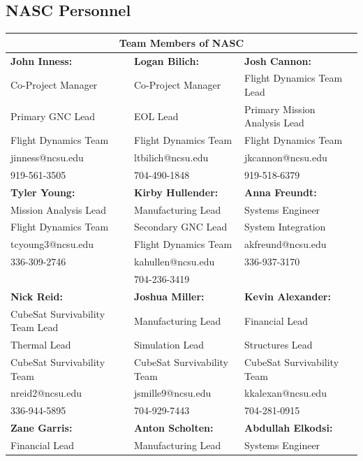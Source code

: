 \subsection{NASC Personnel}
%
\begin{center}
\begin{tabular}{|p{5.3cm}||p{5.3cm}||p{5.3cm}|}
\hline
 \multicolumn{3}{|c|}{Team Members of NASC} \\
 \hline %
 \textbf{John Inness:}&  \textbf{Logan Bilich: }& \textbf{Josh Cannon: }\\ 
 Co-Project Manager   & Co-Project Manager & Flight Dynamics Team Lead   \\
 Primary GNC Lead & EOL Lead & Primary Mission Analysis Lead \\
 Flight Dynamics Team  & Flight Dynamics Team  & Flight Dynamics Team  \\
 jinness@ncsu.edu   & ltbilich@ncsu.edu   & jkcannon@ncsu.edu \\
 919-561-3505  & 704-490-1848 & 919-518-6379 \\
\hline %
 \textbf{Tyler Young: } &  \textbf{Kirby Hullender:} & \textbf{Anna Freundt:}\\ 
  Mission Analysis Lead  & Manufacturing Lead & Systems Engineer   \\
Flight Dynamics Team  & Secondary GNC Lead & System Integration \\
 tcyoung3@ncsu.edu  & Flight Dynamics Team &  akfreund@ncsu.edu \\
 336-309-2746   & kahullen@ncsu.edu & 336-937-3170 \\
 & 704-236-3419  & \\
 \hline %
 \textbf{Nick Reid: }&  \textbf{Joshua Miller: }& \textbf{Kevin Alexander: }\\ 
 CubeSat Survivability Team Lead   & Manufacturing Lead & Financial Lead   \\
 Thermal Lead & Simulation Lead & Structures Lead \\
 CubeSat Survivability Team  & CubeSat Survivability Team  & CubeSat Survivability Team  \\
 nreid2@ncsu.edu    & jsmille9@ncsu.edu  & kkalexan@ncsu.edu  \\
 336-944-5895   & 704-929-7443  & 704-281-0915 \\
 \hline %
 \textbf{Zane Garris: }&  \textbf{Anton Scholten: }& \textbf{Abdullah Elkodsi:}\\ 
 Financial Lead   & Manufacturing Lead & Systems Engineer    \\

\end{tabular}
\end{center}
